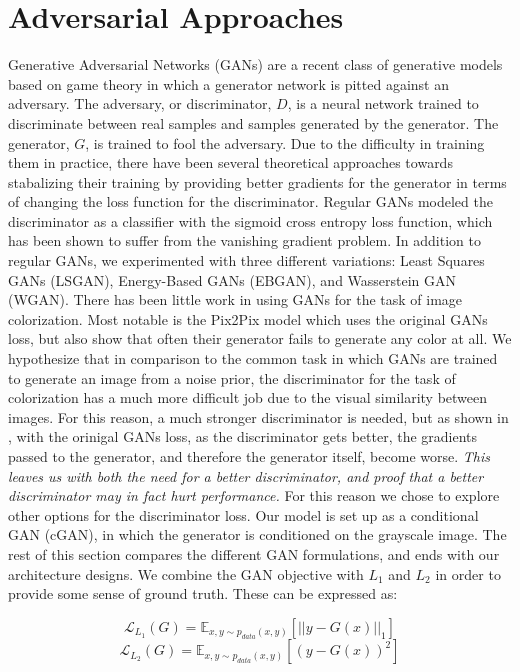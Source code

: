 \documentclass[10pt]{article}
\begin{document}
\section{Adversarial Approaches}
Generative Adversarial Networks (GANs) \cite{goodfellow2014generative} are a recent class of generative models based on game theory
in which a generator network is pitted against an adversary. The adversary, or discriminator, $D$, is a 
neural network trained to discriminate between real samples and samples generated by the generator. The
generator, $G$, is trained to fool the adversary. Due to the difficulty in
training them in practice, there have been several theoretical approaches towards stabalizing their training
by providing better gradients for the generator in terms of changing the loss function for the discriminator.
Regular GANs modeled the discriminator as a classifier with the sigmoid cross entropy loss function,
which has been shown to suffer from the vanishing gradient problem. In addition to regular GANs,
we experimented with three different variations: Least Squares GANs (LSGAN), Energy-Based GANs (EBGAN), and Wasserstein GAN
(WGAN). There has been little work in using GANs for the task of image colorization. Most notable is the
Pix2Pix model which uses the original GANs loss, but also show that often their generator fails to generate
any color at all. We hypothesize that in comparison to the common task in which GANs are trained to generate
an image from a noise prior, the discriminator for the task of colorization has a much more difficult job
due to the visual similarity between images. For this reason, a much stronger discriminator is needed, but
as shown in \cite{arjovsky2017towards}, with the orinigal GANs loss, as the discriminator gets better, the gradients passed to the
generator, and therefore the generator itself, become worse. \textit{This leaves us with both the need for a better discriminator,
and proof that a better discriminator may in fact hurt performance.} For this reason we chose to explore other
options for the discriminator loss. Our model is set up as a conditional GAN (cGAN), in which the
generator is conditioned on the grayscale image. The rest of this section compares the different GAN
formulations, and ends with our architecture designs. We combine the GAN objective with $L_1$ and $L_2$ in
order to provide some sense of ground truth. These can be expressed as:

\[ \mathcal{L}_{L_1}(G) = \mathbb{E}_{x,y\sim p_{data}(x,y)}[||y-G(x)||_1] \]
\[ \mathcal{L}_{L_2}(G) = \mathbb{E}_{x,y\sim p_{data}(x,y)}[(y-G(x))^2] \]
\end{document}
